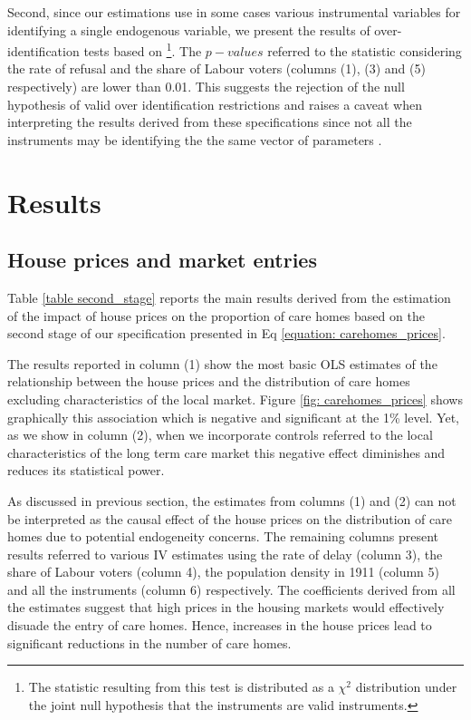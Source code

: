 \documentclass[12pt,letterpaper]{article}
\begin{document}
Second, since our estimations use in some cases various instrumental variables for identifying a single endogenous variable,  
we present the results of over-identification tests based on 
\citet{sargan1958estimation}\footnote{The statistic resulting from this test is distributed as a $\chi^2$ distribution under
the joint null hypothesis that the instruments are valid instruments.}.  The $p-values$ referred to the 
 statistic considering the rate of refusal and the share of Labour voters (columns (1), (3)  and (5) respectively) are lower than 
 0.01.  This suggests the rejection of the null hypothesis of valid over identification restrictions and 
  raises a caveat when interpreting the results derived from these 
  specifications since not all the instruments may be identifying the the same vector of parameters  
  \citep{parente2012cautionary}.
  


\section{Results}
\label{sec: results}

\subsection{House prices and market entries}

Table \ref{table second_stage} reports the main results derived from the estimation of the impact 
of house prices on the proportion of care homes based on the second stage of our 
specification presented in Eq \ref{equation: carehomes_prices}. 


  {}

The results reported in column (1)
show the most basic OLS estimates of the relationship between the house prices and the distribution of care homes excluding 
characteristics of the local market. Figure \ref{fig: carehomes_prices} shows graphically this association which is negative and significant
at the 1\% level. Yet, as we show in column (2), when we 
incorporate controls referred to the local characteristics of the long term care market this 
negative effect diminishes and reduces its statistical power. 

  {}

As discussed in previous section, the estimates from columns (1) and (2) can not be interpreted as
 the causal effect of the house prices
on the distribution of care homes due to potential endogeneity concerns. The 
remaining columns present results referred to various IV estimates using the rate of delay (column 3),
 the share of Labour voters (column 4),  the population density in 1911 (column 5) and all the instruments (column 6) respectively. 
 The coefficients derived from all the estimates suggest that high prices in the 
 housing markets would effectively disuade the entry of care homes. Hence, increases 
  in the house prices lead to significant reductions in the number of care homes. 
 
\end{document}

